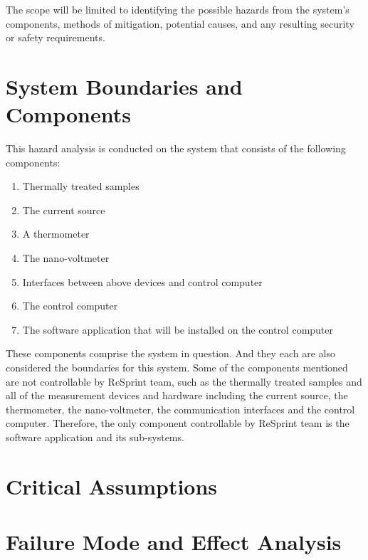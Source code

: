 \documentclass{article}
\begin{document}
\noindent The scope will be limited to identifying the possible hazards from the system's components, methods of mitigation, 
potential causes, and any resulting security or safety requirements.

\section{System Boundaries and Components}

\noindent This hazard analysis is conducted on the system that consists of the following components:

\begin{enumerate}
  \item Thermally treated samples
  \item The current source
  \item A thermometer
  \item The nano-voltmeter
  \item Interfaces between above devices and control computer
  \item The control computer
  \item The software application that will be installed on the control computer
\end{enumerate}

\noindent These components comprise the system in question. And they each are also considered the boundaries for this system. Some of the components mentioned are not controllable by ReSprint team, such as the thermally treated samples and all of the measurement devices and hardware including the current source, the thermometer, the nano-voltmeter, the communication interfaces and the control computer. Therefore, the only component controllable by ReSprint team is the software application and its sub-systems.

\section{Critical Assumptions}



\section{Failure Mode and Effect Analysis}
\end{document}
